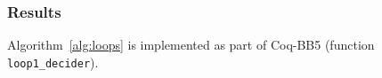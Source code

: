 \subsubsection{Results}\label{sec:loops:results}

Algorithm~\ref{alg:loops} is implemented as part of Coq-BB5 (function \texttt{loop1\_decider}).